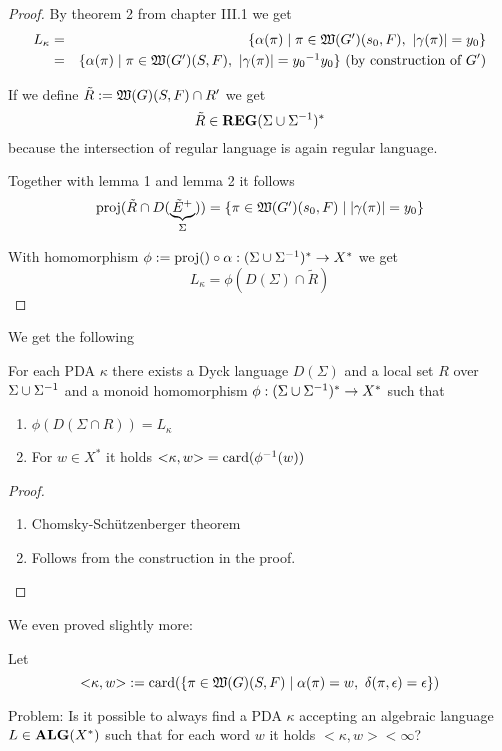 \begin{proof}
By theorem 2 from chapter III.1 we get
\begin{eqnarray*}
L_\kappa &=& \mbox{$\{\alpha(\pi) \mid \pi \in \mbox{$\mathfrak{W}({G'})$}(s_0, F),\
|\gamma(\pi)| = y_0\}$} \\
&=& \mbox{$\{\alpha(\pi) \mid \pi \in \mbox{$\mathfrak{W}({G'})$}(S, F),\
|\gamma(\pi)| = \mbox{${y_0}^{-1}$} y_0\}$}\text{ (by construction of $G'$)}
\end{eqnarray*}

If we define $\tilde{R} := \mbox{$\mathfrak{W}({G})$}(S, F) \cap R'$ we get
\[ \tilde{R} \in \mbox{{\bf REG}}(\Sigma \cup {\Sigma}^{-1})^* \]
because the intersection of regular language is again regular language.

\medskip
Together with lemma 1 and lemma 2 it follows
\[ \mathrm{proj}({\tilde{R} \cap D(\underbrace{\tilde{E}^+}_{\Sigma})}) = \mbox{$\{\pi \in
\mbox{$\mathfrak{W}({G'})$}(s_0, F) \mid |\gamma(\pi)| = y_0\}$} \]

With homomorphism $\phi := \mathrm{proj}({}) \circ \alpha : (\Sigma \cup {\Sigma}^{-1})^* \to X^*$
we get
\[ L_\kappa = \phi(D(\Sigma) \cap \tilde{R}) \]
\end{proof}

\bigskip
We get the following
\begin{corollary}
For each PDA $\kappa$ there exists a Dyck language $D(\Sigma)$ and a local set
$R$ over $\Sigma \cup {\Sigma}^{-1}$ and a monoid homomorphism $\phi:
(\Sigma \cup {\Sigma}^{-1})^* \to X^*$ such that
\begin{enumerate}
  \item $\phi(D(\Sigma\cap R)) = L_\kappa$
  \item For $w\in X^*$ it holds ${<}\kappa, w{>} = \mathrm{card}({\phi^{-1}(w)})$
\end{enumerate}
\end{corollary}

\begin{proof}\ 

\begin{enumerate}
  \item Chomsky-Schützenberger theorem
  \item Follows from the construction in the proof.
\end{enumerate}
\end{proof}

We even proved slightly more:

Let \[ {<}\kappa, w{>} := \mathrm{card}({\mbox{$\{\pi \in \mbox{$\mathfrak{W}({G})$}(S,F) \mid \alpha(\pi)
= w,\ \delta(\pi, \epsilon) = \epsilon\}$}}) \]

Problem: Is it possible to always find a PDA $\kappa$ accepting an algebraic
language $L \in \mbox{{\bf ALG}}(X^*)$ such that for each word $w$ it holds 
${<}\kappa, w{>} < \infty$?

